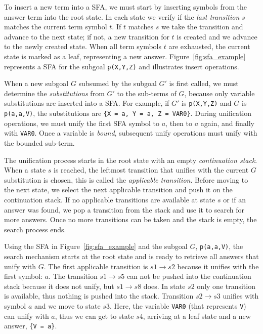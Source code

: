 To insert a new term into a SFA, we must start by inserting symbols from the answer term into the root state.
In each state we verify if the \textit{last transition} $s$ matches the current term symbol $t$. If $t$ matches $s$
we take the transition and advance to the next state; if not, a new transition for $t$ is created and we advance
to the newly created state. When all term symbols $t$ are exhausted, the current state is marked as a leaf,
representing a new answer.
Figure~\ref{fig:sfa_example} represents a SFA for the subgoal \texttt{p(X,Y,Z)} and
illustrates insert operations.

When a new subgoal $G$ subsumed by the subgoal $G'$ is first called, we must determine the \textit{substitutions}
from $G'$ to the sub-terms of $G$, because only variable substitutions are inserted into a SFA.
For example, if $G'$ is \texttt{p(X,Y,Z)} and $G$ is \texttt{p(a,a,V)}, the substitutions
are \texttt{\{X~=~a,~Y~=~a,~Z~=~VAR0\}}. During unification operations, we must unify the first SFA symbol
to $a$, then to $a$ again, and finally with \texttt{VAR0}.
Once a variable is \textit{bound}, subsequent unify operations must unify with the bounded sub-term.

The unification process starts in the root state with an empty \textit{continuation stack}.
When a state $s$ is reached, the leftmost transition that unifies with the current $G$ substitution is chosen,
this is called the \textit{applicable transition}.
Before moving to the next state, we select the next applicable transition and push it on the continuation stack.
If no applicable transitions are available at state $s$ or if an answer was found, we pop a transition from
the stack and use it to search for more answers. Once no more transitions can be taken and the stack is empty, the
search process ends.

Using the SFA in Figure~\ref{fig:sfa_example} and the subgoal $G$, \texttt{p(a,a,V)}, the search mechanism starts
at the root state and is ready to retrieve all answers that unify with $G$.
The first applicable transition is $s1 \rightarrow s2$ because it unifies with the first symbol: $a$. The transition
$s1 \rightarrow s5$ can not be pushed into the continuation stack because it does not unify, but $s1 \rightarrow s8$ does.
In state $s2$ only one transition is available, thus nothing is pushed into the stack.
Transition $s2 \rightarrow s3$ unifies with symbol $a$ and we move to state $s3$. Here, the variable \texttt{VAR0} (that represents \texttt{V})
can unify with $a$, thus we can get to state $s4$, arriving at a leaf state and a new answer, \texttt{\{V~=~a\}}.


